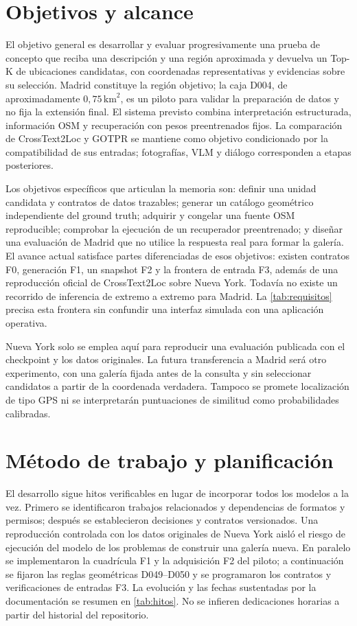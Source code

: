 \section{Objetivos y alcance}
\label{sec:objetivos}
El objetivo general es desarrollar y evaluar progresivamente una prueba de concepto que reciba una descripción y una región aproximada y devuelva un Top-K de ubicaciones candidatas, con coordenadas representativas y evidencias sobre su selección. Madrid constituye la región objetivo; la caja D004, de aproximadamente \(0{,}75\,\mathrm{km}^2\), es un piloto para validar la preparación de datos y no fija la extensión final. El sistema previsto combina interpretación estructurada, información OSM y recuperación con pesos preentrenados fijos. La comparación de CrossText2Loc y GOTPR se mantiene como objetivo condicionado por la compatibilidad de sus entradas; fotografías, VLM y diálogo corresponden a etapas posteriores.

Los objetivos específicos que articulan la memoria son: definir una unidad candidata y contratos de datos trazables; generar un catálogo geométrico independiente del ground truth; adquirir y congelar una fuente OSM reproducible; comprobar la ejecución de un recuperador preentrenado; y diseñar una evaluación de Madrid que no utilice la respuesta real para formar la galería. El avance actual satisface partes diferenciadas de esos objetivos: existen contratos F0, generación F1, un snapshot F2 y la frontera de entrada F3, además de una reproducción oficial de CrossText2Loc sobre Nueva York. Todavía no existe un recorrido de inferencia de extremo a extremo para Madrid. La \cref{tab:requisitos} precisa esta frontera sin confundir una interfaz simulada con una aplicación operativa.

Nueva York solo se emplea aquí para reproducir una evaluación publicada con el checkpoint y los datos originales. La futura transferencia a Madrid será otro experimento, con una galería fijada antes de la consulta y sin seleccionar candidatos a partir de la coordenada verdadera. Tampoco se promete localización de tipo GPS ni se interpretarán puntuaciones de similitud como probabilidades calibradas.

\section{Método de trabajo y planificación}
\label{sec:metodo}
El desarrollo sigue hitos verificables en lugar de incorporar todos los modelos a la vez. Primero se identificaron trabajos relacionados y dependencias de formatos y permisos; después se establecieron decisiones y contratos versionados. Una reproducción controlada con los datos originales de Nueva York aisló el riesgo de ejecución del modelo de los problemas de construir una galería nueva. En paralelo se implementaron la cuadrícula F1 y la adquisición F2 del piloto; a continuación se fijaron las reglas geométricas D049--D050 y se programaron los contratos y verificaciones de entradas F3. La evolución y las fechas sustentadas por la documentación se resumen en \cref{tab:hitos}. No se infieren dedicaciones horarias a partir del historial del repositorio.

